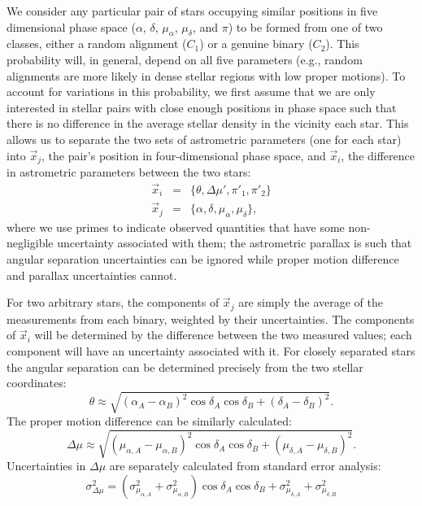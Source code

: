 \documentclass[usenatbib]{mnras}
\begin{document}
We consider any particular pair of stars occupying similar positions in five dimensional phase space ($\alpha$, $\delta$, $\mu_{\alpha}$, $\mu_{\delta}$, and $\pi$) to be formed from one of two classes, either a random alignment ($C_1$) or a genuine binary ($C_2$). This probability will, in general, depend on all five parameters (e.g., random alignments are more likely in dense stellar regions with low proper motions). To account for variations in this probability, we first assume that we are only interested in stellar pairs with close enough positions in phase space such that there is no difference in the average stellar density in the vicinity each star. This allows us to separate the two sets of astrometric parameters (one for each star) into $\vec{x}_j$, the pair's position in four-dimensional phase space, and $\vec{x}_i$, the difference in astrometric parameters between the two stars:
\begin{eqnarray}
\vec{x}_i &=& \{\theta, \Delta \mu', \pi'_1, \pi'_2 \} \\
\vec{x}_j &=& \{ \alpha, \delta, \mu_{\alpha}, \mu_{\delta} \},
\end{eqnarray}
where we use primes to indicate observed quantities that have some non-negligible uncertainty associated with them; the astrometric parallax is such that angular separation uncertainties can be ignored while proper motion difference and parallax uncertainties cannot. 

For two arbitrary stars, the components of $\vec{x}_j$ are simply the average of the measurements from each binary, weighted by their uncertainties. The components of $\vec{x}_i$ will be determined by the difference between the two measured values; each component will have an uncertainty associated with it. For closely separated stars the angular separation can be determined precisely from the two stellar coordinates:
\begin{equation}
\theta \approx \sqrt{(\alpha_A - \alpha_B)^2 \cos \delta_A \cos \delta_B
			 + (\delta_A - \delta_B)^2}.
\end{equation}
The proper motion difference can be similarly calculated:
\begin{equation}
\Delta \mu \approx \sqrt{(\mu_{\alpha, A} - \mu_{\alpha, B})^2 
			\cos \delta_A \cos \delta_B 
			+ (\mu_{\delta, A} - \mu_{\delta, B})^2}.
\end{equation}
Uncertainties in $\Delta \mu$ are separately calculated from standard error analysis:
\begin{equation}
\sigma_{\Delta \mu}^2 = \left( \sigma_{\mu_{\alpha, A}}^2 + \sigma_{\mu_{\alpha, B}}^2 \right) \cos \delta_A \cos \delta_B + \sigma_{\mu_{\delta, A}}^2 + \sigma_{\mu_{\delta, B}}^2  
\end{equation}
\end{document}
